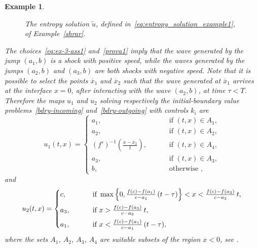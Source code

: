 \documentclass[a4paper, 10pt, final]{article}
\newtheorem{example}{Example}[section]
\begin{document}
\begin{example}
\begin{figure}
    \caption{The entropy solution $\widetilde u$, defined in~\eqref{eq:entropy_solution_example1},
      of Example~\ref{shrar}.}
    \label{fig:ex-3-fig1}
  \end{figure}
  The choices~\eqref{eq:ex-3-ass1} and~\eqref{prova1} imply that
  the wave generated by the jump $(a_1, b)$
  is a shock with positive speed, while
  the waves generated by the jumps $(a_2, b)$ and $(a_3, b)$
  are both shocks with negative speed. 
  Note that it is possible to select the points $\overline{x}_1$ and $\overline{x}_2$ such that
  the wave generated at $\overline{x}_1$ arrives at the interface $x=0$,
  after interacting with the wave $(a_2, b)$, at time $\tau < T$.
  Therefore the maps $u_1$ and $u_2$ solving respectively the initial-boundary value problems~\eqref{bdry-incoming}
  and~\eqref{bdry-outgoing} with controls $k_i$ are
  \begin{equation}
    \label{eq:u_1_example1}
    u_1(t,x) = 
      \begin{cases}
        a_1, &\qquad \textrm{ if } (t,x) \in A_1,
        \\
        a_2, &\qquad \textrm{ if } (t,x) \in A_2, 
        \\
        (f')^{-1} \left(\frac{x -  \overline{x}_2}{t}\right),  
        &\qquad \textrm{ if } (t,x) \in A_4,
        \\
        a_3, &\qquad \textrm{ if } (t,x) \in A_3, 
        \\
        b, &\qquad \textrm{ otherwise },
      \end{cases}
      \end{equation}
  and
  \begin{equation}
    \label{eq:u_2_example1}
    u_2(t,x)  =
      \begin{cases}          
        c, &\qquad \textrm{ if } \max\left\{0, \frac{f(c) - f(a_1)}{c - a_1}
          \, (t - \tau)\right\} < x < \frac{f(c) - f(a_3)}{c - a_3} \, t,
        \vspace{.2cm}\\
        a_3, &\qquad \textrm{ if } x > \frac{f(c) - f(a_3)}{c - a_3} \, t,
        \vspace{.2cm}\\
        a_1, &\qquad \textrm{ if } x < \frac{f(c) - f(a_1)}{c - a_1} \, (t - \tau),
      \end{cases}
  \end{equation}
  where 
  the sets $A_1$, $A_2$, $A_3$, $A_4$ are suitable subsets of the region $x<0$,
  see . 
  

\end{example}
\end{document}
